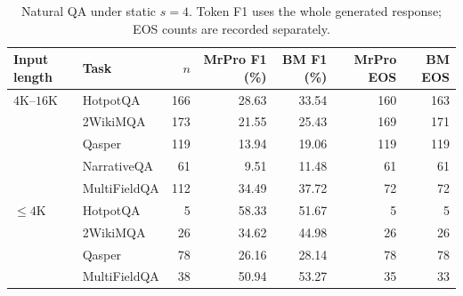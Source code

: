 \begin{table}[ht]
\centering\small
\caption{Natural QA under static $s=4$. Token F1 uses the whole generated response; EOS counts are recorded separately.}
\label{tab:bm-qa-complete}
\begin{tabular}{@{}llrrrrr@{}}
\toprule
Input length & Task & $n$ & MrPro F1 (\%) & BM F1 (\%) & MrPro EOS & BM EOS\\
\midrule
$4$K--$16$K & HotpotQA & 166 & 28.63 & 33.54 & 160 & 163 \\
 & 2WikiMQA & 173 & 21.55 & 25.43 & 169 & 171 \\
 & Qasper & 119 & 13.94 & 19.06 & 119 & 119 \\
 & NarrativeQA & 61 & 9.51 & 11.48 & 61 & 61 \\
 & MultiFieldQA & 112 & 34.49 & 37.72 & 72 & 72 \\
\midrule
$\le4$K & HotpotQA & 5 & 58.33 & 51.67 & 5 & 5 \\
 & 2WikiMQA & 26 & 34.62 & 44.98 & 26 & 26 \\
 & Qasper & 78 & 26.16 & 28.14 & 78 & 78 \\
 & MultiFieldQA & 38 & 50.94 & 53.27 & 35 & 33 \\
\bottomrule
\end{tabular}
\end{table}
